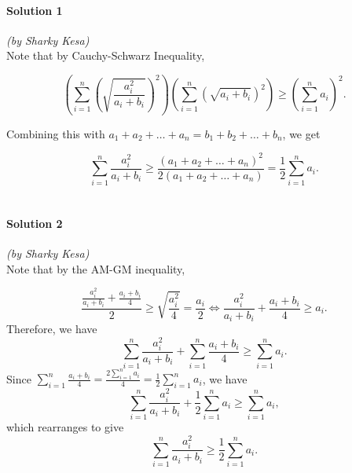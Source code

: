 \documentclass[10pt]{article}
\begin{document}
		\noindent \makebox[\linewidth]{\rule{\textwidth}{0.4pt}}
	
	\paragraph{Solution 1} \textit{(by Sharky Kesa)}\\
	
	\noindent Note that by Cauchy-Schwarz Inequality,
	
	\[\left ( \displaystyle \sum \limits_{i=1}^n \left(\sqrt{\dfrac{a_i^2}{a_i + b_i}}\right)^2 \right ) \left ( \displaystyle \sum \limits_{i=1}^n \left(\sqrt{a_i + b_i}\right)^2 \right ) \geq \left (\displaystyle \sum \limits_{i=1}^n a_i \right )^2.\]
	
	\noindent Combining this with \(a_1 + a_2 + \dots + a_n = b_1 + b_2 + \dots + b_n\), we get
	
	\[\displaystyle \sum \limits_{i=1}^n \dfrac{a_i^2}{a_i + b_i} \geq \dfrac{(a_1 + a_2 + \dots + a_n)^2}{2(a_1 + a_2 + \dots + a_n)} = \frac{1}{2} \displaystyle \sum \limits_{i=1}^n a_i. \tag*{\(\square\)}\]\\[-13pt]
	
		\noindent \makebox[\linewidth]{\rule{\textwidth}{0.4pt}}
		
	\paragraph{Solution 2} \textit{(by Sharky Kesa)}\\
	
	\noindent Note that by the AM-GM inequality,
	
	\[\frac{\frac{a_i^2}{a_i + b_i} + \frac{a_i + b_i}{4}}{2} \geq \sqrt{\frac{a_i^2}{4}} = \frac{a_i}{2} \iff \frac{a_i^2}{a_i + b_i} + \frac{a_i + b_i}{4} \geq a_i.\]
	Therefore, we have 
	\[\displaystyle \sum_{i = 1}^n \frac{a_i^2}{a_i + b_i} + \displaystyle \sum_{i = 1}^n \frac{a_i + b_i}{4} \geq \displaystyle \sum_{i=1}^n a_i.\]
	Since \(\sum \limits_{i=1}^n \frac{a_i+b_i}{4} = \frac{2 \sum \limits_{i=1}^n a_i}{4} = \frac{1}{2} \sum \limits_{i=1}^n a_i\), we have
	 \[\displaystyle \sum_{i = 1}^n \frac{a_i^2}{a_i + b_i} + \frac{1}{2} \displaystyle \sum_{i=1}^n a_i \geq \displaystyle \sum_{i=1}^n a_i,\]
	 which rearranges to give
	 \[\sum_{i=1}^n \frac{a_i^2}{a_i+b_i} \geq \frac 12 \sum_{i=1}^n a_i.\tag*{\(\square\)}\]\\[-13pt]
	 
	 \noindent \makebox[\linewidth]{\rule{\textwidth}{0.4pt}}
	 
\end{document}
